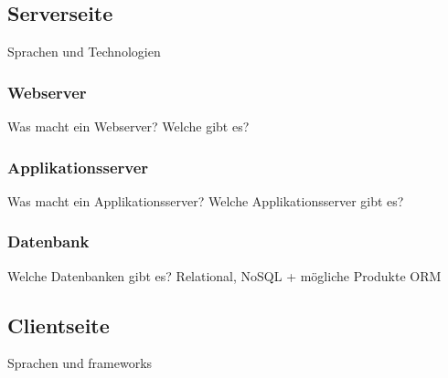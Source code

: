 \subsection{Serverseite}
Sprachen und Technologien

\subsubsection{Webserver}
Was macht ein Webserver? Welche gibt es?

\subsubsection{Applikationsserver}
Was macht ein Applikationsserver? Welche Applikationsserver gibt es?

\subsubsection{Datenbank}
Welche Datenbanken gibt es? Relational, NoSQL + mögliche Produkte
ORM

\subsection{Clientseite}
Sprachen und frameworks

